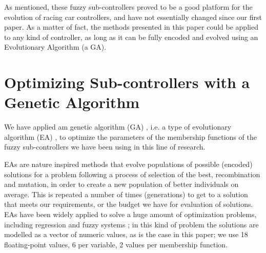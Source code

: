 \documentclass[10pt,journal,compsoc]{IEEEtran}
\begin{document}
As mentioned, these fuzzy sub-controllers proved to be a good platform for the evolution of racing car controllers, and have not essentially changed since our first paper. As a matter of fact, the methods presented in this paper could
be applied to any kind of controller, as long as it can be fully
encoded and evolved using an Evolutionary Algorithm (a GA). 




\section{Optimizing Sub-controllers with a Genetic Algorithm}
\label{sec:ga}

We have applied am genetic algorithm (GA) \cite{GAs_Goldberg89}, i.e. a type of evolutionary algorithm (EA) \cite{EAs_Back96}, to optimize the parameters of the membership functions of the fuzzy sub-controllers we have been using in this line of research.

EAs are nature inspired methods that evolve populations of possible (encoded) solutions for a problem following a process of selection of the best,
recombination and mutation, in order to create a new population of
better individuals on average. This is repeated a number of times
(generations) to get to a solution that meets our requirements, or the
budget we have for evaluation of solutions. EAs have been widely
applied to solve a huge amount of optimization problems, including regression and fuzzy systems \cite{hoffmann2001evolutionary}; in this kind of problem the solutions are modelled as a vector of numeric values, as is the
case in this paper; we use 18 floating-point values, 6 per variable, 2 values per membership function.


\end{document}
